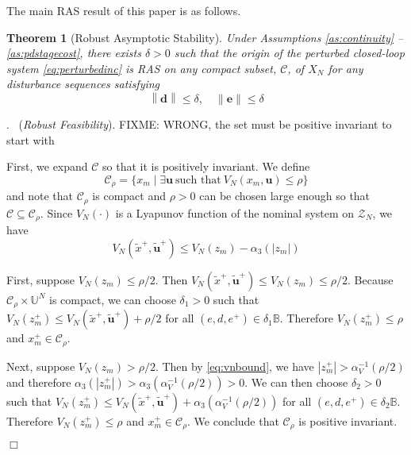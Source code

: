 \documentclass{article}
\newtheorem{theorem}{Theorem}
\newenvironment{proof}{\noindent {\em Proof}.\ }{\hspace*{\fill}$\Box$\medskip\\}
\newcommand{\abs}[1]{\left\lvert #1 \right\rvert}
\newcommand{\norm}[1]{\left\lVert #1 \right\rVert}
\begin{document}
The main RAS result of this paper is as follows.

\begin{theorem}[Robust Asymptotic Stability]
\label{th:mainiss}
Under Assumptions \ref{as:continuity} -- \ref{as:pdstagecost}, there exists
$\delta > 0$ such that the origin of the perturbed closed-loop system 
\eqref{eq:perturbedinc} is RAS on any compact subset, $\mathcal{C}$, of ${X}_N$ for 
any disturbance sequences
satisfying
\begin{equation*}
\norm{\mathbf{d}} \leq \delta, \quad \norm{\mathbf{e}} \leq \delta
\end{equation*}
\end{theorem}
\begin{proof}
(\emph{Robust Feasibility}). 
FIXME: WRONG, the set must be positive invariant to start with

First, we expand $\mathcal{C}$ so that
it is positively invariant. We define
\begin{equation*}
\mathcal{C}_\rho = \{x_m \mid \exists \mathbf{u} \ \text{such that} \ V_N(x_m,\mathbf{u}) \leq \rho \}
\end{equation*}
and note that $\mathcal{C}_\rho$ is compact and $\rho > 0$ can be chosen large enough so that 
$\mathcal{C} \subseteq \mathcal{C}_\rho$. 
Since $V_N(\cdot)$ is a Lyapunov function of the nominal system on $\mathcal{Z}_N$, we have
\begin{equation*}
V_N(\tilde{x}^+,\tilde{\mathbf{u}}^+) \leq V_N(z_m) - \alpha_3(\abs{z_m})
\end{equation*}

First, suppose $V_N(z_m) \leq \rho/2$. Then $V_N(\tilde{x}^+,\tilde{\mathbf{u}}^+) \leq V_N(z_m) \leq \rho/2$. 
Because $\mathcal{C}_\rho \times \mathbb{U}^N$ is compact, we can choose $\delta_1 > 0$ such that 
$V_N(z_m^+) \leq V_N(\tilde{x}^+,\tilde{\mathbf{u}}^+) + \rho/2$ for all $(e,d,e^+) \in \delta_1\mathbb{B}$.
Therefore $V_N(z_m^+) \leq \rho$ and $x_m^+ \in \mathcal{C}_\rho$.

Next, suppose $V_N(z_m) > \rho/2$. Then by
\eqref{eq:vnbound}, we have $\abs{z_m^+} > \alpha_V^{-1}(\rho/2)$ and therefore 
$\alpha_3(\abs{z_m^+}) > \alpha_3(\alpha_V^{-1}(\rho/2)) > 0$. We can then choose $\delta_2 > 0$ such that
$V_N(z_m^+) \leq V_N(\tilde{x}^+,\tilde{\mathbf{u}}^+) + \alpha_3(\alpha_V^{-1}(\rho/2))$
for all $(e,d,e^+) \in \delta_2\mathbb{B}$. Therefore $V_N(z_m^+) \leq \rho$ and $x_m^+ \in \mathcal{C}_\rho$.
We conclude that $\mathcal{C}_\rho$ is positive invariant.


\end{proof}
\end{document}
